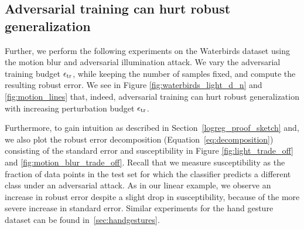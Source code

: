 \subsection{Adversarial training can hurt robust generalization}

Further, we perform the following experiments on the Waterbirds dataset using the motion blur and adversarial illumination attack. We vary the adversarial training  budget $\epsilon_{\text{tr}}$, while keeping the number of samples fixed, and compute the resulting robust error.
We see in Figure \ref{fig:waterbirds_light_d_n} and \ref{fig:motion_lines} that, indeed, adversarial training can hurt robust generalization with increasing perturbation budget $\epsilon_{\text{tr}}$.

Furthermore, to gain intuition as described in Section~\ref{logreg_proof_sketch} and, we also plot the robust error decomposition (Equation~\ref{eq:decomposition}) consisting of the standard error and susceptibility in Figure \ref{fig:light_trade_off} and \ref{fig:motion_blur_trade_off}. Recall that we measure susceptibility as the fraction of data points in the test set for
which the classifier predicts a different class under an adversarial attack.
As in our linear example, we observe an increase in robust error despite a slight drop
in susceptibility, because of the more severe increase in standard error. 
Similar experiments for the hand gesture dataset can be
found in~\ref{sec:handgestures}. 


